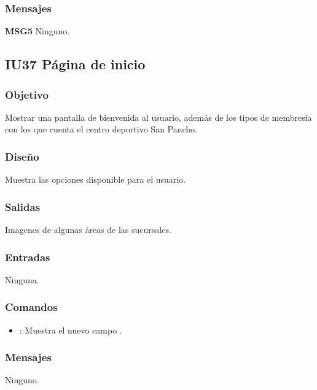 \subsubsection{Mensajes}
	\begin{Citemize}
		\item {\bf MSG5} Ninguno.
	\end{Citemize}


\subsection{IU37 Página de inicio}

\subsubsection{Objetivo}
	Mostrar una pantalla de bienvenida al usuario, además de los tipos de membresía con los que cuenta el centro deportivo San Pancho.

\subsubsection{Diseño}
	Muestra las opciones disponible para el usuario.


\subsubsection{Salidas}

	Imagenes de algunas áreas de las sucursales.

\subsubsection{Entradas}
	Ninguna.

\subsubsection{Comandos}
\begin{itemize}
	\item {}: Muestra el nuevo campo .
\end{itemize}

\subsubsection{Mensajes}
	\begin{Citemize}
		\item Ninguno.
	\end{Citemize}
	
